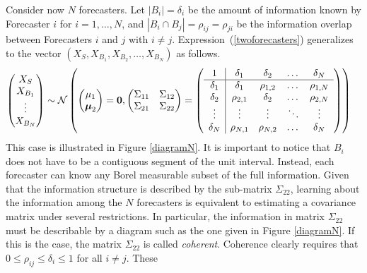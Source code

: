 \documentclass[11pt]{article}
\theoremstyle{definition}
\theoremstyle{definition}
\begin{document}
Consider now $N$ forecasters. Let $|B_i| = \delta_i$ be the amount of
information known by Forecaster $i$ for $i = 1, \dots, N$, and $|B_i
\cap B_j| = \rho_{ij} = \rho_{ji}$ be the information overlap between
Forecasters $i$ and $j$ with $i \neq j$.
Expression~(\ref{twoforecasters}) generalizes to the vector
$\left(X_{S}, X_{B_1}, X_{B_2}, \dots, X_{B_N}\right)$ as follows.
\begin{align}
\left(\begin{matrix} X_S \\ X_{B_1}\\ \vdots \\ X_{B_N} \end{matrix}\right) &\sim \mathcal{N}\left( \left(\begin{matrix} 
\mu_1 \\ \boldsymbol{\mu}_2
 \end{matrix}\right) =
 \boldsymbol{0}, \left(\begin{matrix} 
\Sigma_{11} & \Sigma_{12}\\
\Sigma_{21} & \Sigma_{22}\\
 \end{matrix}\right) 
 =
 \left(\begin{array}{c | c c cc }
1 & \delta_1 & \delta_2 & \dots & \delta_N  \\ \hline
\delta_1 & \delta_1 &\rho_{1,2} & \dots & \rho_{1,N}   \\ 
\delta_2 & \rho_{2,1} & \delta_2 & \dots & \rho_{2,N}  \\ 
\vdots & \vdots & \vdots & \ddots & \vdots  \\ 
\delta_N & \rho_{N,1} & \rho_{N,2} & \dots & \delta_N\\ 
 \end{array}\right)\right)  \label{Nforecasters}
\end{align}
This case is illustrated in Figure \ref{diagramN}.  It is important to
notice that $B_i$ does not have to be a contiguous segment of the unit
interval.  Instead, each forecaster can know any Borel measurable
subset of the full information.  Given that the information structure
is described by the sub-matrix $\Sigma_{22}$, learning about the
information among the $N$ forecasters is equivalent to estimating a
covariance matrix under several restrictions.  In particular, the
information in matrix $\Sigma_{22}$ must be describable by a diagram
such as the one given in Figure \ref{diagramN}. If this is the case,
the matrix $\Sigma_{22}$ is called \textit{coherent}.  Coherence
clearly requires that $0 \leq \rho_{ij} \leq \delta_i \leq 1$ for all $i \neq j$.  These
\end{document}
